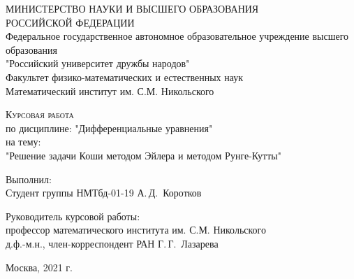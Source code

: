 \documentclass[a4paper,14pt]{article}
\begin{document}
\begin{titlepage}
  \begin{center}
МИНИСТЕРСТВО НАУКИ И ВЫСШЕГО ОБРАЗОВАНИЯ\\
РОССИЙСКОЙ ФЕДЕРАЦИИ\\
    
Федеральное государственное автономное образовательное учреждение высшего образования\\
"Российский университет дружбы народов"\\
Факультет физико-математических и естественных наук\\
Математический институт им. С.М. Никольского
\vfill
 
\textsc{Курсовая работа}\\[5mm]
по дисциплине: "Дифференциальные уравнения"\\
на тему:\\
"Решение задачи Коши методом Эйлера и методом Рунге-Кутты"
\end{center}
\vfill
 
\newlength{\ML}
\hfill\begin{minipage}{0.4\textwidth}
  Выполнил:\\
  Студент группы НМТбд-01-19
  А.\,Д.~Коротков\\
\end{minipage}

\hfill\begin{minipage}{0.4\textwidth}
  Руководитель курсовой работы:\\
  профессор математического института им. С.М. Никольского\\
  д.ф.-м.н., член-корреспондент РАН
  Г.\,Г.~Лазарева\\
\end{minipage}%
\bigskip
\vfill
 
\begin{center}
  Москва, 2021 г.
\end{center}
\end{titlepage}


\tableofcontents
\newpage
{}
\end{document}

